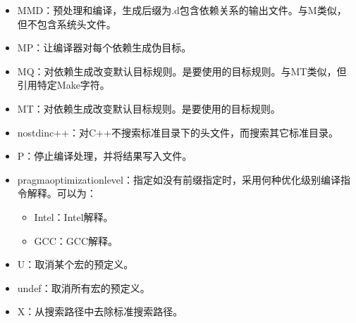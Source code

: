 \documentclass[a4paper,12pt,english]{sphinxmanual}
\begin{document}
\begin{itemize}
\item {} 
\sphinxAtStartPar
\sphinxhyphen{}MMD：预处理和编译，生成后缀为.d包含依赖关系的输出文件。与\sphinxhyphen{}M类似，但不包含系统头文件。

\item {} 
\sphinxAtStartPar
\sphinxhyphen{}MP：让编译器对每个依赖生成伪目标。

\item {} 
\sphinxAtStartPar
\sphinxhyphen{}MQ：对依赖生成改变默认目标规则。是要使用的目标规则。与\sphinxhyphen{}MT类似，但引用特定Make字符。

\item {} 
\sphinxAtStartPar
\sphinxhyphen{}MT：对依赖生成改变默认目标规则。是要使用的目标规则。

\item {} 
\sphinxAtStartPar
\sphinxhyphen{}nostdinc++：对C++不搜索标准目录下的头文件，而搜索其它标准目录。

\item {} 
\sphinxAtStartPar
\sphinxhyphen{}P：停止编译处理，并将结果写入文件。

\item {} 
\sphinxAtStartPar
\sphinxhyphen{}pragma\sphinxhyphen{}optimization\sphinxhyphen{}level：指定如没有前缀指定时，采用何种优化级别编译指令解释。可以为：
\begin{itemize}
\item {} 
\sphinxAtStartPar
Intel：Intel解释。

\item {} 
\sphinxAtStartPar
GCC：GCC解释。

\end{itemize}

\item {} 
\sphinxAtStartPar
\sphinxhyphen{}U：取消某个宏的预定义。

\item {} 
\sphinxAtStartPar
\sphinxhyphen{}undef：取消所有宏的预定义。

\item {} 
\sphinxAtStartPar
\sphinxhyphen{}X：从搜索路径中去除标准搜索路径。

\end{itemize}
\end{document}
